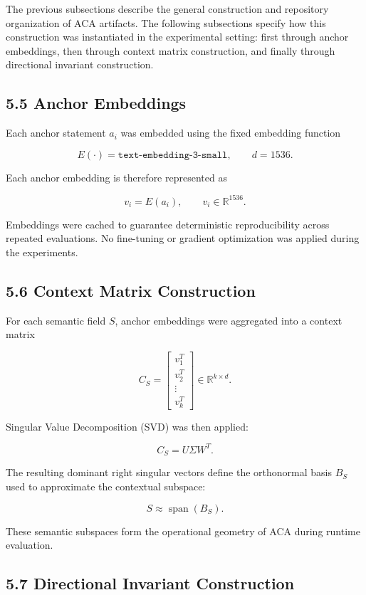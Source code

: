 \documentclass[11pt]{article}
\begin{document}
The previous subsections describe the general construction and repository organization of ACA artifacts. The following subsections specify how this construction was instantiated in the experimental setting: first through anchor embeddings, then through context matrix construction, and finally through directional invariant construction.

\subsection{5.5 Anchor Embeddings}

Each anchor statement $a_i$ was embedded using the fixed embedding function

$$
E(\cdot)=\texttt{text-embedding-3-small},
\qquad
d=1536.
$$

Each anchor embedding is therefore represented as

$$
v_i=E(a_i),
\qquad
v_i\in\mathbb{R}^{1536}.
$$

Embeddings were cached to guarantee deterministic reproducibility across repeated evaluations. No fine-tuning or gradient optimization was applied during the experiments.

\subsection{5.6 Context Matrix Construction}

For each semantic field $S$, anchor embeddings were aggregated into a context matrix

$$
C_S
=
\begin{bmatrix}
v_1^{T} \\
v_2^{T} \\
\vdots \\
v_k^{T}
\end{bmatrix}
\in\mathbb{R}^{k\times d}.
$$

Singular Value Decomposition (SVD) was then applied:

$$
C_S
=
U\Sigma W^{T}.
$$

The resulting dominant right singular vectors define the orthonormal basis $B_S$ used to approximate the contextual subspace:

$$
S
\approx
\operatorname{span}(B_S).
$$

These semantic subspaces form the operational geometry of ACA during runtime evaluation.

\subsection{5.7 Directional Invariant Construction}
\end{document}
